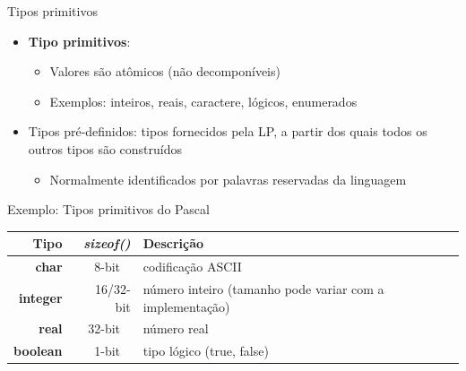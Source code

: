 \documentclass[handout]{beamer}
\begin{document}
\begin{frame}[fragile]{Tipos primitivos}
   \begin{itemize}
   \item \textbf{Tipo primitivos}:
      \begin{itemize}
      \item Valores são atômicos (não decomponíveis)
      \item Exemplos: inteiros, reais, caractere, lógicos, enumerados
			\end{itemize}
	\item Tipos pré-definidos: tipos fornecidos pela LP, a partir dos quais todos os outros tipos são construídos
		\begin{itemize}
		\item Normalmente identificados por palavras reservadas da linguagem
		\end{itemize}
  \end{itemize}

\begin{block}{Exemplo: Tipos primitivos do Pascal}
\scriptsize
\centering
    \begin{tabular}{rrp{3.8cm}p{3.8cm}}
    \hline
    \textbf{Tipo} & \textbf{\textit{sizeof()}} & \textbf{Descrição} \\
    \hline
    \textbf{char}    &   8-bit     & codificação ASCII \\
    \textbf{integer} &  16/32-bit  & número inteiro (tamanho pode variar com a implementação) \\
    \textbf{real}    &   32-bit    & número real \\
    \textbf{boolean} &   1-bit     & tipo lógico (true, false) \\
    \hline
    \end{tabular}%
\end{block}

\end{frame}
\end{document}
